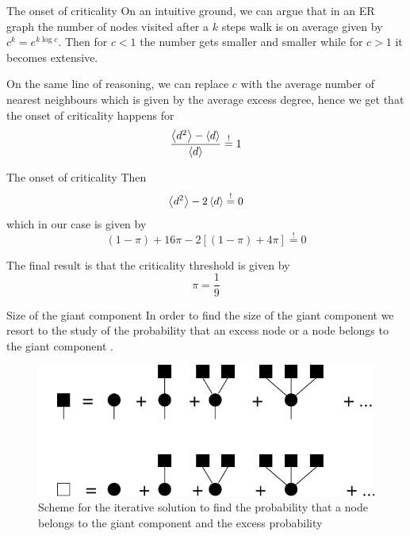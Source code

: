 \documentclass[handout]{beamer}
\newcommand{\reqeq}{\overset{!}{=}}
\begin{document}
\begin{frame}{The onset of criticality}
    On an intuitive ground, we can argue that in an ER graph the number of nodes
    visited after a $k$ steps walk is on average given by $c^k=e^{k\log{c}}$.
    Then for $c<1$ the number gets smaller and smaller while for $c>1$ it
    becomes extensive.

    On the same line of reasoning, we can replace $c$ with the average number of
    nearest neighbours which is given by the average excess degree, hence we get
    that the onset of criticality happens for
    \begin{equation}
        \frac{\expval{d^2} - \expval{d}}{\expval{d}} \reqeq 1
        \label{eq:onset_condition}
    \end{equation}
\end{frame}

\begin{frame}{The onset of criticality}
    Then
    $$
    \expval{d^2} - 2\expval{d} \reqeq 0
    $$
    which in our case is given by
    $$
    (1-\pi) + 16 \pi - 2 [(1-\pi) + 4 \pi] \reqeq 0
    $$

    The final result is that the criticality threshold is given by
    \begin{equation}
        \pi = \frac{1}{9}
    \end{equation}
\end{frame}

\begin{frame}{Size of the giant component}
    In order to find the size of the giant component we resort to the study of
    the probability that an excess node or a node belongs to the giant
    component \cite[56]{weigt}.

    \begin{figure}
        \centering
        \includegraphics[width=.6\textwidth]{PTCOP_iterative}
        \caption{Scheme for the iterative solution to find the probability that
        a node belongs to the giant component and the excess probability}
        \label{fig:iterative}
    \end{figure}
\end{frame}
\end{document}
